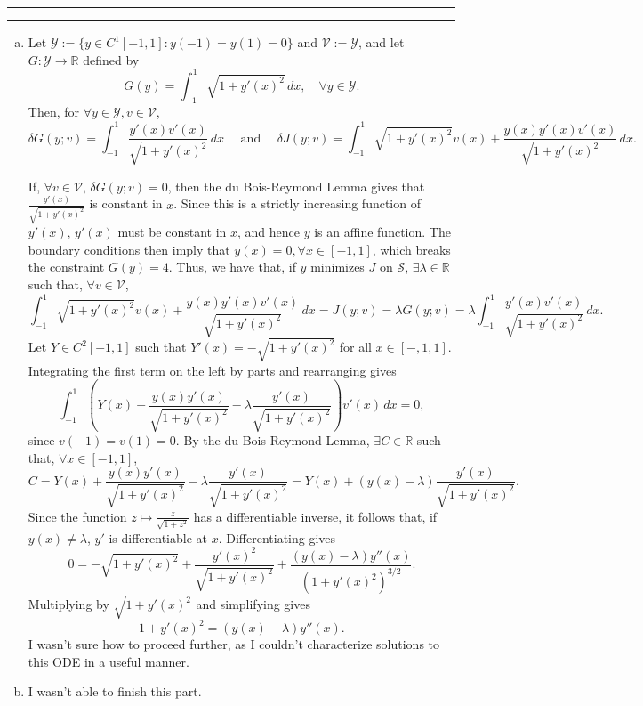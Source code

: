 \documentclass[11pt]{article}
\newcounter{questionCounter}
\newcounter{partCounter}[questionCounter]
\newenvironment{question}[2][\arabic{questionCounter}]{%
    \setcounter{partCounter}{0}%
    \vspace{.25in} \hrule \vspace{0.5em}%
        \noindent{\bf #2}%
    \vspace{0.8em} \hrule \vspace{.10in}%
    \addtocounter{questionCounter}{1}%
}{}
\newcommand{\R}{\mathbb{R}}             %
\renewcommand{\S}{\mathscr{S}}          %
\newcommand{\Y}{\mathscr{Y}}            %
\newcommand{\V}{\mathscr{V}}            %
\begin{document}
\newpage
\begin{question}{Problem 5}
\begin{enumerate}[(a)]
\item
Let $\Y := \{y \in C^1[-1,1] : y(-1) = y(1) = 0\}$ and $\V := \Y$, and let
$G : \Y \to \R$ defined by
\[G(y) = \int_{-1}^1 \sqrt{1 + y'(x)^2} \, dx, \quad \forall y \in \Y.\]
Then, for
$\forall y  \in \Y, v \in \V$,
\[\delta G(y;v)
    = \int_{-1}^1 \frac{y'(x)v'(x)}{\sqrt{1 + y'(x)^2}} \, dx
    \quad \mbox{ and } \quad
  \delta J(y;v)
    = \int_{-1}^1 \sqrt{1 + y'(x)^2}v(x)
    + \frac{y(x)y'(x)v'(x)}{\sqrt{1 + y'(x)^2}} \, dx.
\]

If, $\forall v \in \V$, $\delta G(y;v) = 0$, then the du Bois-Reymond Lemma
gives that $\frac{y'(x)}{\sqrt{1 + y'(x)^2}}$ is constant in $x$. Since this is
a strictly increasing function of $y'(x)$, $y'(x)$ must be constant in $x$, and
hence $y$ is an affine function. The boundary conditions then imply that
$y(x) = 0, \forall x \in [-1,1]$, which breaks the constraint $G(y) = 4$. Thus,
we have that, if $y$ minimizes $J$ on $\S$, $\exists \lambda \in \R$ such that,
$\forall v \in \V$,
\[\int_{-1}^1 \sqrt{1 + y'(x)^2}v(x)
    + \frac{y(x)y'(x)v'(x)}{\sqrt{1 + y'(x)^2}} \, dx
    = J(y;v)
    = \lambda G(y;v)
    = \lambda \int_{-1}^1 \frac{y'(x)v'(x)}{\sqrt{1 + y'(x)^2}} \, dx.
\]
Let $Y \in C^2[-1,1]$ such that $Y'(x) = -\sqrt{1 + y'(x)^2}$ for all
$x \in [-,1,1]$. Integrating the first term on the left by parts and
rearranging gives
\[\int_{-1}^1 \left( Y(x)
    + \frac{y(x)y'(x)}{\sqrt{1 + y'(x)^2}}
    - \lambda \frac{y'(x)}{\sqrt{1 + y'(x)^2}} \right)v'(x) \, dx
    = 0,
\]
since $v(-1) = v(1) = 0$. By the du Bois-Reymond Lemma, $\exists C \in \R$ such
that, $\forall x \in [-1,1]$,
\[C
    = Y(x)
    + \frac{y(x)y'(x)}{\sqrt{1 + y'(x)^2}}
    - \lambda \frac{y'(x)}{\sqrt{1 + y'(x)^2}}
    = Y(x)
    + (y(x) - \lambda)\frac{y'(x)}{\sqrt{1 + y'(x)^2}}.
\]
Since the function $z \mapsto \frac{z}{\sqrt{1 + z^2}}$ has a differentiable
inverse, it follows that, if $y(x) \neq \lambda$, $y'$ is differentiable at
$x$. Differentiating gives
\[0
    = -\sqrt{1 + y'(x)^2} + \frac{y'(x)^2}{\sqrt{1 + y'(x)^2}}
    + \frac{(y(x) - \lambda)y''(x)}{(1 + y'(x)^2)^{3/2}}.
\]
Multiplying by $\sqrt{1 + y'(x)^2}$ and simplifying gives
\[1 + y'(x)^2
    = (y(x) - \lambda)y''(x).
\]
I wasn't sure how to proceed further, as I couldn't characterize solutions to
this ODE in a useful manner.

\item I wasn't able to finish this part.

\end{enumerate}
\end{question}
\end{document}
